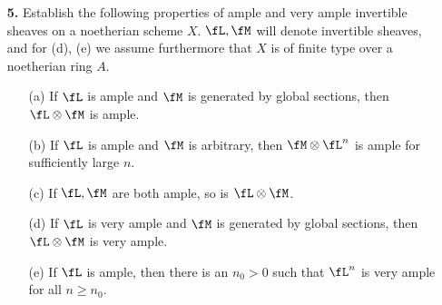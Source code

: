 \documentclass[a4paper]{article}
\begin{document}
\begin{enumerate} [label=\textbf{\arabic*.}, leftmargin=-0em]
          \begin{proof} $ $ \vspace{0pt}
              \begin{itemize} [leftmargin=0cm]
                  \item[(a)] Let $\fL$ be the invertible sheaf on $\P^n$ associated to the morphism $\varphi : \P^n \to \P^m$, which is generated by global sections $s_i = \varphi^*(x_i)$, $i = 0, 1, \dots, m$.
                        Pick $P \in \varphi^{-1}((1, 0, \dots, 0))$ (we can assume such $P$ always exists by applying an automorphism of $\P^m$).
                        Identifying $\fL_P \cong \fO_{P, \P^n}$, we see that $(s_i)_P$ for $i \neq 0$ is not a unit, and they generate the local ring of $\fO_{P, \P^n}$.
                        Since $\P^n$ is smooth, the minimal number of generators of the maximal ideal of $\fO_{P, \P^n}$ is equal to the dimension $n$.
                        The sections $s_i$ generate $\fO_{P, \P^n}$.
                        Hence, $m \geq n$.
                        Our proof also shows the induced homomorphism of local rings $\varphi_P : \fO_{\varphi(P), \P^m} \to \fO_{P, \P^n}$ is surjective, which implies $\fO_{\varphi(P), \varphi(\P^n)} = \fO_{\varphi(P), \P^m} / \ker{\varphi_P} \cong \fO_{P, \P^n}$.
                        Hence, $\varphi(P)$ has dimension $n$.
              \end{itemize}
          \end{proof}

    \item[\textbf{5.}] Establish the following properties of ample and very ample invertible sheaves on a noetherian scheme $X$. $\fL, \fM$ will denote invertible sheaves, and for (d), (e) we assume furthermore that $X$ is of finite type over a noetherian ring $A$.
          \begin{itemize}
              \item[(a)] If $\fL$ is ample and $\fM$ is generated by global sections, then $\fL \otimes \fM$ is ample.
              \item[(b)] If $\fL$ is ample and $\fM$ is arbitrary, then $\fM \otimes \fL^n$ is ample for sufficiently large $n$.
              \item[(c)] If $\fL, \fM$ are both ample, so is $\fL \otimes \fM$.
              \item[(d)] If $\fL$ is very ample and $\fM$ is generated by global sections, then $\fL \otimes \fM$ is very ample.
              \item[(e)] If $\fL$ is ample, then there is an $n_0 > 0$ such that $\fL^n$ is very ample for all $n \geq n_0$.
          \end{itemize}


\end{enumerate}
\end{document}
